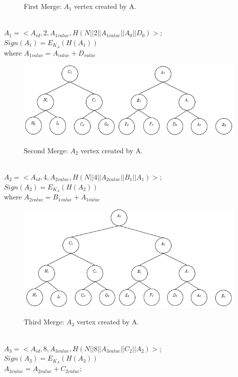 \begin{exmp}
\begin{figure}[hp]
					\caption{First Merge: $A_{1}$ vertex created by A.}
					\label{fig:commitment-tree-example-2}
				\end{figure}\\
				$A_{1} = <A_{id}, 2, A_{1value}, H(N||2||A_{1value}||A_{0}||D_{0})>$; $Sign(A_{1}) = E_{K_{A}}(H(A_{1}))$\\
				where $A_{1value} = A_{value} + D_{value} $
				\begin{figure}[hp]
					\centering
					\includegraphics[scale = 1]{images/commitment-tree-example-3.png}\\
					\caption{Second Merge: $A_{2}$ vertex created by A.}
					\label{fig:commitment-tree-example-3}
				\end{figure}\\
				$A_{2} = <A_{id}, 4, A_{2value}, H(N||4||A_{2value}||B_{1}||A_{1}) >$; $Sign(A_{2}) = E_{K_{A}}(H({A_{2}}))$\\
				where $A_{2value} = B_{1value} + A_{1value} $
				\begin{figure}[hp]
					\centering
					\includegraphics[scale = 1]{images/commitment-tree-example-4.png}\\
					\caption{Third Merge: $A_{3}$ vertex created by A.}
					\label{fig:commitment-tree-example-4}
				\end{figure}\\
				$A_{3} = <A_{id},8, A_{3value},H(N||8||A_{3value}||C_{2}||A_{2})>$; $Sign(A_{3}) = E_{K_{A}}(H(A_{3}))$\\
				$A_{3value} = A_{2value} + C_{2value}$;
			\end{exmp}

